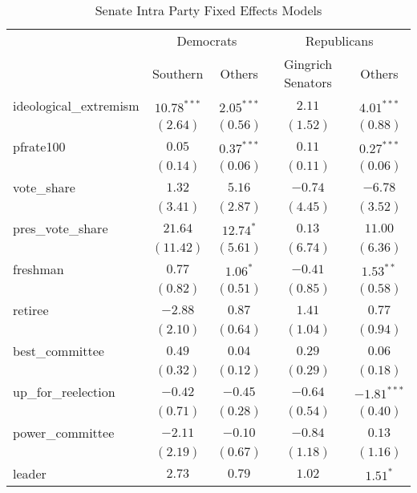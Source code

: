 \documentclass[12pt]{article}
\begin{document}
\begin{table}
	\begin{center}
		\caption{Senate Intra Party Fixed Effects Models}
		\begin{tabular}{l c c c c }
			\hline
			& \multicolumn{2}{c}{Democrats} & \multicolumn{2}{c}{Republicans} \\
			\cline{2-5}
			& Southern & Others & Gingrich Senators & Others \\
			\hline
			ideological\_extremism  & $10.78^{***}$ & $2.05^{***}$ & $2.11$   & $4.01^{***}$  \\
			& $(2.64)$      & $(0.56)$     & $(1.52)$ & $(0.88)$      \\
			pfrate100               & $0.05$        & $0.37^{***}$ & $0.11$   & $0.27^{***}$  \\
			& $(0.14)$      & $(0.06)$     & $(0.11)$ & $(0.06)$      \\
			vote\_share             & $1.32$        & $5.16$       & $-0.74$  & $-6.78$       \\
			& $(3.41)$      & $(2.87)$     & $(4.45)$ & $(3.52)$      \\
			pres\_vote\_share       & $21.64$       & $12.74^{*}$  & $0.13$   & $11.00$       \\
			& $(11.42)$     & $(5.61)$     & $(6.74)$ & $(6.36)$      \\
			freshman                & $0.77$        & $1.06^{*}$   & $-0.41$  & $1.53^{**}$   \\
			& $(0.82)$      & $(0.51)$     & $(0.85)$ & $(0.58)$      \\
			retiree                 & $-2.88$       & $0.87$       & $1.41$   & $0.77$        \\
			& $(2.10)$      & $(0.64)$     & $(1.04)$ & $(0.94)$      \\
			best\_committee         & $0.49$        & $0.04$       & $0.29$   & $0.06$        \\
			& $(0.32)$      & $(0.12)$     & $(0.29)$ & $(0.18)$      \\
			up\_for\_reelection     & $-0.42$       & $-0.45$      & $-0.64$  & $-1.81^{***}$ \\
			& $(0.71)$      & $(0.28)$     & $(0.54)$ & $(0.40)$      \\
			power\_committee        & $-2.11$       & $-0.10$      & $-0.84$  & $0.13$        \\
			& $(2.19)$      & $(0.67)$     & $(1.18)$ & $(1.16)$      \\
			leader                  & $2.73$        & $0.79$       & $1.02$   & $1.51^{*}$    \\

\end{tabular}
\end{center}
\end{table}
\end{document}
